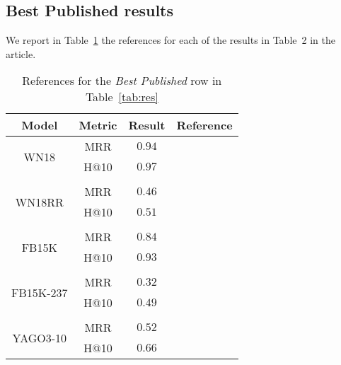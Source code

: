 \documentclass{article}
\begin{document}
\subsection{Best Published results}
We report in Table~\ref{tab:ref} the references for each of the results in Table~2 in the article.
\begin{table}[h]
\begin{tabular}{cccc}
\toprule
Model & Metric & Result & Reference \\
\midrule
\multirow{2}{*}{WN18} & MRR & $0.94$ & \citet{trouillon_complex_2016} \\
{}                    & H@10& $\bm{0.97}$ & \citet{ma2017transt} \\
\\
\multirow{2}{*}{WN18RR} & MRR & $0.46$ & \citet{dettmers2017convolutional} \\
{}                      & H@10& $\bm{0.51}$ & \citet{dettmers2017convolutional} \\
\\
\multirow{2}{*}{FB15K} & MRR & $0.84$ & \citet{kadlec_knowledge_2017} \\
{}                     & H@10& $\bm{0.93}$ & \citet{shen2016implicit} \\
\\
\multirow{2}{*}{FB15K-237} & MRR & $0.32$ & \citet{dettmers2017convolutional} \\
{}                         & H@10& $0.49$ & \citet{dettmers2017convolutional} \\
\\
\multirow{2}{*}{YAGO3-10} & MRR & $0.52$ & \citet{dettmers2017convolutional} \\
{}                        & H@10& $0.66$ & \citet{dettmers2017convolutional} \\


\bottomrule
\end{tabular}
\caption{References for the \emph{Best Published} row in Table~\ref{tab:res}}
\label{tab:ref}
\end{table}
\end{document}
